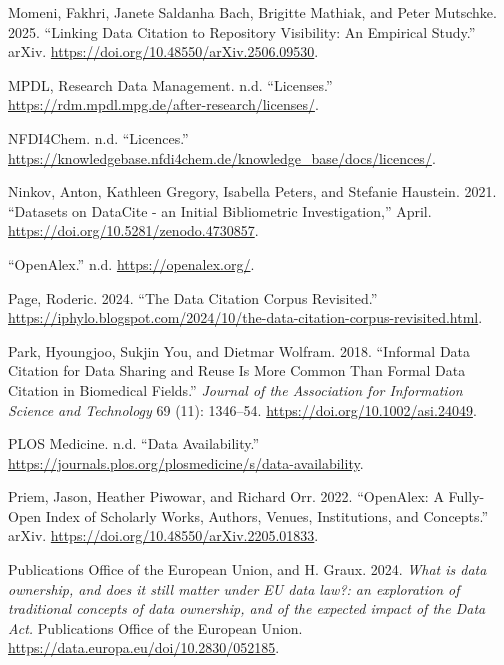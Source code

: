 \documentclass[
  letterpaper,
  DIV=11,
  numbers=noendperiod]{scrartcl}
\newlength{\cslhangindent}
\newenvironment{CSLReferences}[2] %
 {\begin{list}{}{%
  \setlength{\itemindent}{0pt}
  \setlength{\leftmargin}{0pt}
  \setlength{\parsep}{0pt}
  \ifodd #1
   \setlength{\leftmargin}{\cslhangindent}
   \setlength{\itemindent}{-1\cslhangindent}
  \fi
  \setlength{\itemsep}{#2\baselineskip}}}
 {\end{list}}
\begin{document}
\begin{CSLReferences}{1}{0}
Momeni, Fakhri, Janete Saldanha Bach, Brigitte Mathiak, and Peter
Mutschke. 2025. {``Linking {Data Citation} to {Repository Visibility}:
{An Empirical Study}.''} arXiv.
\url{https://doi.org/10.48550/arXiv.2506.09530}.

MPDL, Research Data Management. n.d. {``Licenses.''}
\url{https://rdm.mpdl.mpg.de/after-research/licenses/}.

NFDI4Chem. n.d. {``Licences.''}
\url{https://knowledgebase.nfdi4chem.de/knowledge_base/docs/licences/}.

Ninkov, Anton, Kathleen Gregory, Isabella Peters, and Stefanie Haustein.
2021. {``Datasets on DataCite - an Initial Bibliometric
Investigation,''} April. \url{https://doi.org/10.5281/zenodo.4730857}.

{``OpenAlex.''} n.d. \url{https://openalex.org/}.

Page, Roderic. 2024. {``The Data Citation Corpus Revisited.''}
\url{https://iphylo.blogspot.com/2024/10/the-data-citation-corpus-revisited.html}.

Park, Hyoungjoo, Sukjin You, and Dietmar Wolfram. 2018. {``Informal Data
Citation for Data Sharing and Reuse Is More Common Than Formal Data
Citation in Biomedical Fields.''} \emph{Journal of the Association for
Information Science and Technology} 69 (11): 1346--54.
\url{https://doi.org/10.1002/asi.24049}.

PLOS Medicine. n.d. {``Data Availability.''}
\url{https://journals.plos.org/plosmedicine/s/data-availability}.

Priem, Jason, Heather Piwowar, and Richard Orr. 2022. {``{OpenAlex}: {A}
Fully-Open Index of Scholarly Works, Authors, Venues, Institutions, and
Concepts.''} arXiv. \url{https://doi.org/10.48550/arXiv.2205.01833}.

Publications Office of the European Union, and H. Graux. 2024.
\emph{What is data ownership, and does it still matter under EU data
law?: an exploration of traditional concepts of data ownership, and of
the expected impact of the Data Act.} {Publications Office of the
European Union}. \url{https://data.europa.eu/doi/10.2830/052185}.


\end{CSLReferences}
\end{document}
